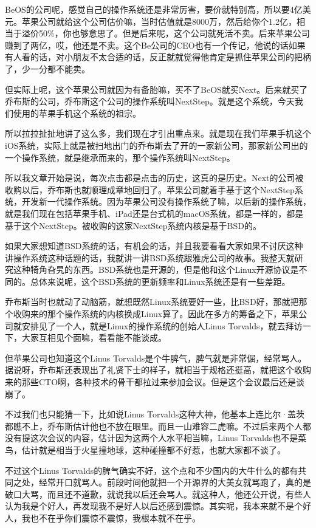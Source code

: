 \documentclass[
  letterpaper,
  DIV=11,
  numbers=noendperiod]{scrreprt}
\begin{document}
BeOS的公司呢，感觉自己的操作系统还是非常厉害，要价就特别高，所以要4亿美元。苹果公司就给这个公司估价嘛，当时估值就是8000万，然后给你个1.2亿，相当于溢价50\%，你也够意思了。但是后来呢，这个公司就死活不卖。后来苹果公司赚到了两亿，哎，他还是不卖。这个Be公司的CEO也有一个传记，他说的话如果有人看的话，对小朋友不太合适的话，反正就就觉得他肯定是抓住苹果公司的把柄了，少一分都不能卖。

但实际上呢，这个苹果公司就因为有备胎嘛，买不了BeOS就买Next。后来就买了乔布斯的公司，乔布斯这个公司的操作系统叫NextStep。就是这个系统，今天我们使用的苹果手机这个系统的祖宗。

所以拉拉扯扯地讲了这么多，我们现在才引出重点来。就是现在我们苹果手机这个iOS系统，实际上就是被扫地出门的乔布斯去了开的一家新公司，那家新公司出的一个操作系统，就是继承而来的，那个操作系统叫NextStep。

所以我文章开始是说，每次点击都是点击的历史，这真的是历史。Next的公司被收购以后，乔布斯也就顺理成章地回归了。苹果公司就着手基于这个NextStep系统，开发新一代操作系统。因为苹果公司没有操作系统了嘛，以后新的操作系统，就是我们现在包括苹果手机、iPad还是台式机的macOS系统，都是一样的，都是基于这个NextStep。被收购的这家NextStep系统内核是基于BSD的。

如果大家想知道BSD系统的话，有机会的话，并且我要看看大家如果不讨厌这种讲操作系统这种话题的话，我就讲一讲BSD系统跟雅虎公司的故事。我整天就研究这种犄角旮旯的东西。BSD系统也是开源的，但是他和这个Linux开源协议是不同的。总体来说呢，这个BSD系统的更新频率和Linux系统还是有一些差距。

乔布斯当时也就动了动脑筋，就想既然Linux系统要好一些，比BSD好，那就把那个收购来的那个操作系统的内核换成Linux算了。因此在多方的筹备之下，苹果公司就安排见了一个人，就是Linux的操作系统的创始人Linus
Torvalds，就去拜访一下，大家互相见个面嘛，看看能不能谈成。

但苹果公司也知道这个Linus
Torvalds是个牛脾气，脾气就是非常倔，经常骂人。据说呀，乔布斯还表现出了礼贤下士的样子，就相当于规格还挺高，就把这个收购来的那些CTO啊，各种技术的骨干都拉过来参加会议。但是这个会议最后还是谈崩了。

不过我们也只能猜一下，比如说Linus
Torvalds这种大神，他基本上连比尔·盖茨都瞧不上，乔布斯估计他也不放在眼里。而且一山难容二虎嘛。不过后来两个人都没有提这次会议的内容，估计因为这两个人水平相当嘛，Linus
Torvalds也不是菜鸟，估计就是相当于火星撞地球，这种碰撞都不好惹，也就大家都不谈了。

不过这个Linus
Torvalds的脾气确实不好，这个点和不少国内的大牛什么的都有共同之处，经常开口就骂人。前段时间他就把一个开源界的大美女就骂跑了，真的是破口大骂，而且还不道歉，就说我以后还会骂人。就这种人，他还公开说，有些人认为我是个好人，再发现我不是好人以后还感到震惊。其实呢，我本来就不是个好人，我也不在乎你们震惊不震惊，我根本就不在乎。
\end{document}
